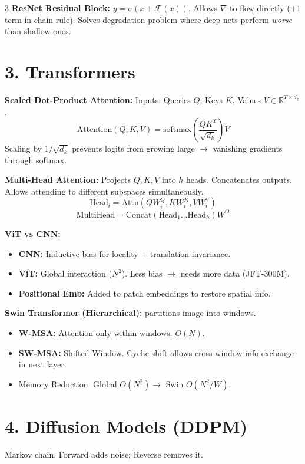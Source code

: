 \documentclass[10pt]{article}
\newcommand{\R}{\mathbb{R}}
\begin{document}
\begin{multicols*}{3}
\textbf{ResNet Residual Block:}
$y = \sigma(x + \mathcal{F}(x))$. 
Allows $\nabla$ to flow directly ($+1$ term in chain rule). Solves degradation problem where deep nets perform \textit{worse} than shallow ones.

\section*{3. Transformers}
\textbf{Scaled Dot-Product Attention:}
Inputs: Queries $Q$, Keys $K$, Values $V \in \R^{T \times d_k}$.
$$ \text{Attention}(Q, K, V) = \text{softmax}\left(\frac{QK^T}{\sqrt{d_k}}\right)V $$
Scaling by $1/\sqrt{d_k}$ prevents logits from growing large $\to$ vanishing gradients through softmax.

\textbf{Multi-Head Attention:}
Projects $Q,K,V$ into $h$ heads. Concatenates outputs.
Allows attending to different subspaces simultaneously.
$$ \text{Head}_i = \text{Attn}(QW_i^Q, KW_i^K, VW_i^V) $$
$$ \text{MultiHead} = \text{Concat}(\text{Head}_1 \dots \text{Head}_h)W^O $$

\textbf{ViT vs CNN:}
\begin{itemize}
    \item \textbf{CNN:} Inductive bias for locality + translation invariance.
    \item \textbf{ViT:} Global interaction ($N^2$). Less bias $\to$ needs more data (JFT-300M).
    \item \textbf{Positional Emb:} Added to patch embeddings to restore spatial info.
\end{itemize}

\textbf{Swin Transformer (Hierarchical):}
partitions image into windows.
\begin{itemize}
    \item \textbf{W-MSA:} Attention only within windows. $O(N)$.
    \item \textbf{SW-MSA:} Shifted Window. Cyclic shift allows cross-window info exchange in next layer.
    \item Memory Reduction: Global $O(N^2) \to$ Swin $O(N^2/W)$.
\end{itemize}

\section*{4. Diffusion Models (DDPM)}
Markov chain. Forward adds noise; Reverse removes it.


\end{multicols*}
\end{document}
